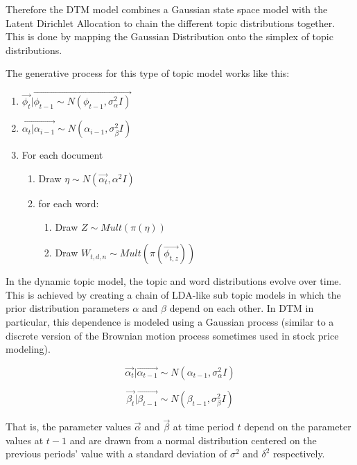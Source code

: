 \documentclass[12pt,journal,letterpaper,oneside,onecolumn]{IEEEtran}
\begin{document}
Therefore the DTM model combines a Gaussian state space model with the Latent Dirichlet Allocation to chain the different topic distributions together.
This is done by mapping the Gaussian Distribution onto the simplex of topic distributions.

The generative process for this type of topic model works like this:
\begin{enumerate}
	\item $\vec{\phi_t} | \vec{\phi_{t-1} \sim N(\phi_{t-1}, \sigma_{\alpha}^2 I)}$
	\item $\vec{\alpha_t | \alpha_{i-1}} \sim N(\alpha_{i-1}, \sigma_{\beta}^2 I)$
	\item For each document
	\begin{enumerate}
		\item Draw $\eta \sim N(\vec{\alpha_t} , \alpha^2 I)$
		\item for each word:
		\begin{enumerate}
			\item Draw $Z \sim Mult(\pi(\eta))$
			\item Draw $W_{t,d,n} \sim Mult(\pi(\vec{\phi_{t,z}}))$
		\end{enumerate}
	\end{enumerate}
\end{enumerate}


In the dynamic topic model, the topic and word distributions evolve over time. This is achieved by creating a chain of LDA-like sub topic models in which the prior distribution parameters $\alpha$ and $\beta$ depend on each other. 
In DTM in particular, this dependence is modeled using a Gaussian process (similar to a discrete version of the Brownian motion process sometimes used in stock price modeling).

\begin{equation}
\vec{\alpha_{t}} | \vec{\alpha_{t-1}} \sim N (\alpha_{t-1}, \sigma_{\alpha}^2 I )
\end{equation}

\begin{equation}
\vec{\beta_{t}} | \vec{\beta_{t-1}} \sim N (\beta_{t-1}, \sigma_{\beta}^2 I )
\end{equation}

That is, the parameter values $\vec{\alpha}$ and $\vec{\beta}$ at time period $t$ depend on the parameter values at $t-1$  and are drawn from a normal distribution centered on the previous periods' value with a standard deviation of $\sigma^2$ and $\delta^2$ respectively.
\end{document}
